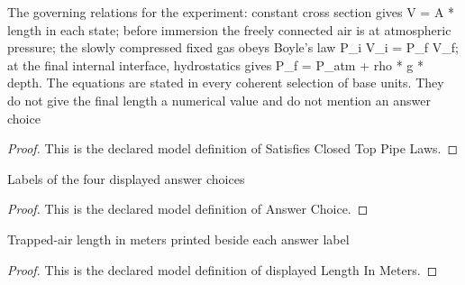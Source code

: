 \begin{definition}
  \label{def:physics:phyx-mini-0364:phyxminiproblems-problemphyxmini0364-satisfiesclosedtoppipelaws}
  The governing relations for the experiment: constant cross section gives V = A * length in each state; before immersion the freely connected air is at atmospheric pressure; the slowly compressed fixed gas obeys Boyle's law P\_i V\_i = P\_f V\_f; at the final internal interface, hydrostatics gives P\_f = P\_atm + rho * g * depth. The equations are stated in every coherent selection of base units. They do not give the final length a numerical value and do not mention an answer choice
\end{definition}
\begin{proof}
  This is the declared model definition of Satisfies Closed Top Pipe Laws.
\end{proof}
\begin{definition}
  \label{def:physics:phyx-mini-0364:phyxminiproblems-problemphyxmini0364-answerchoice}
  Labels of the four displayed answer choices
\end{definition}
\begin{proof}
  This is the declared model definition of Answer Choice.
\end{proof}
\begin{definition}
  \label{def:physics:phyx-mini-0364:phyxminiproblems-problemphyxmini0364-displayedlengthinmeters}
  Trapped-air length in meters printed beside each answer label
\end{definition}
\begin{proof}
  This is the declared model definition of displayed Length In Meters.
\end{proof}

